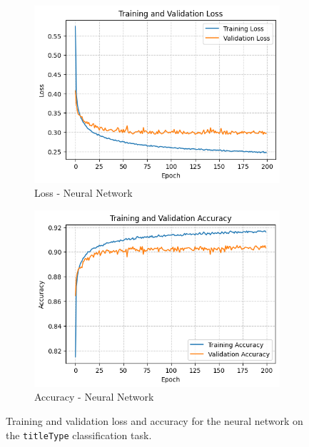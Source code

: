 \begin{figure}[H]
    \centering
    \begin{subfigure}[b]{0.48\textwidth}
        \centering
        \includegraphics[width=\textwidth]{plotsss/loss_titletype.png}
        \caption{Loss - Neural Network}
        \label{fig:loss_nn_titletype}
    \end{subfigure}
    \hfill
    \begin{subfigure}[b]{0.48\textwidth}
        \centering
        \includegraphics[width=\textwidth]{plotsss/accuracy_titletype.png}
        \caption{Accuracy - Neural Network}
        \label{fig:accuracy_nn_titletype}
    \end{subfigure}
    \caption{Training and validation loss and accuracy for the neural network on the \texttt{titleType} classification task.}
    \label{fig:nn_performance_titletype}
\end{figure}

